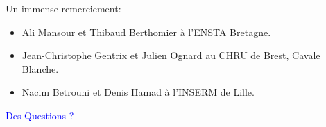 \documentclass{beamer}
\begin{document}


\begin{frame}

Un immense remerciement:

\begin{itemize}
\item Ali Mansour et Thibaud Berthomier à l'ENSTA Bretagne.
\item Jean-Christophe Gentrix et Julien Ognard au CHRU de Brest, Cavale Blanche.
\item Nacim Betrouni et Denis Hamad à l'INSERM de Lille.
\end{itemize}

\end{frame}

\begin{frame}

\begin{center}
\textcolor{blue}{\Huge Des Questions ?}
\end{center}

\end{frame}
\end{document}
